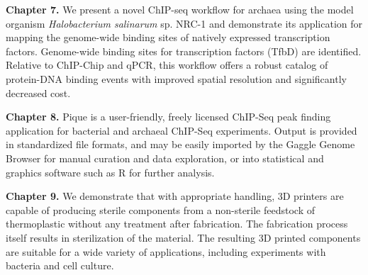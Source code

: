 

\noindent\textbf{Chapter 7.} We present a novel ChIP-seq workflow for archaea using the model organism {\em
Halobacterium salinarum} sp. NRC-1 and demonstrate its application for mapping
the genome-wide binding sites of natively expressed transcription factors.
Genome-wide binding sites for transcription factors (TfbD) are identified.
Relative to ChIP-Chip and qPCR, this workflow offers a robust catalog of
protein-DNA binding events with improved spatial resolution and significantly
decreased cost. %

\noindent\textbf{Chapter 8.} Pique is a user-friendly, freely licensed ChIP-Seq peak finding application
for bacterial and archaeal ChIP-Seq experiments. Output is provided in
standardized file formats, and may be easily imported by the Gaggle Genome
Browser for manual curation and data exploration, or into statistical and
graphics software such as R for further analysis. %


\noindent\textbf{Chapter 9.} We demonstrate that with
appropriate handling, 3D printers are capable of producing sterile components
from a non-sterile feedstock of thermoplastic without any treatment after
fabrication. The fabrication process itself results in sterilization of the
material. The resulting 3D printed components are suitable for a wide variety
of applications, including experiments with bacteria and cell culture.

